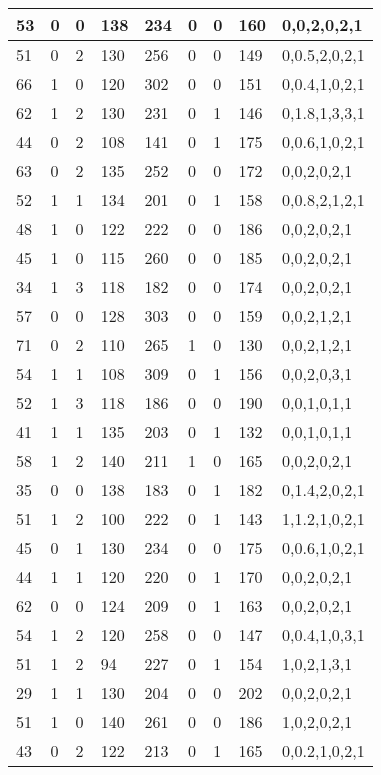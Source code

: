 \documentclass{article}
\begin{document}
\begin{table}[h!]
\begin{tabular}{|l|l|l|l|l|l|l|l|l|}
53 & 0 & 0 & 138 & 234 & 0 & 0 & 160 & 0,0,2,0,2,1 \\ \hline
51 & 0 & 2 & 130 & 256 & 0 & 0 & 149 & 0,0.5,2,0,2,1 \\ \hline
66 & 1 & 0 & 120 & 302 & 0 & 0 & 151 & 0,0.4,1,0,2,1 \\ \hline
62 & 1 & 2 & 130 & 231 & 0 & 1 & 146 & 0,1.8,1,3,3,1 \\ \hline
44 & 0 & 2 & 108 & 141 & 0 & 1 & 175 & 0,0.6,1,0,2,1 \\ \hline
63 & 0 & 2 & 135 & 252 & 0 & 0 & 172 & 0,0,2,0,2,1 \\ \hline
52 & 1 & 1 & 134 & 201 & 0 & 1 & 158 & 0,0.8,2,1,2,1 \\ \hline
48 & 1 & 0 & 122 & 222 & 0 & 0 & 186 & 0,0,2,0,2,1 \\ \hline
45 & 1 & 0 & 115 & 260 & 0 & 0 & 185 & 0,0,2,0,2,1 \\ \hline
34 & 1 & 3 & 118 & 182 & 0 & 0 & 174 & 0,0,2,0,2,1 \\ \hline
57 & 0 & 0 & 128 & 303 & 0 & 0 & 159 & 0,0,2,1,2,1 \\ \hline
71 & 0 & 2 & 110 & 265 & 1 & 0 & 130 & 0,0,2,1,2,1 \\ \hline
54 & 1 & 1 & 108 & 309 & 0 & 1 & 156 & 0,0,2,0,3,1 \\ \hline
52 & 1 & 3 & 118 & 186 & 0 & 0 & 190 & 0,0,1,0,1,1 \\ \hline
41 & 1 & 1 & 135 & 203 & 0 & 1 & 132 & 0,0,1,0,1,1 \\ \hline
58 & 1 & 2 & 140 & 211 & 1 & 0 & 165 & 0,0,2,0,2,1 \\ \hline
35 & 0 & 0 & 138 & 183 & 0 & 1 & 182 & 0,1.4,2,0,2,1 \\ \hline
51 & 1 & 2 & 100 & 222 & 0 & 1 & 143 & 1,1.2,1,0,2,1 \\ \hline
45 & 0 & 1 & 130 & 234 & 0 & 0 & 175 & 0,0.6,1,0,2,1 \\ \hline
44 & 1 & 1 & 120 & 220 & 0 & 1 & 170 & 0,0,2,0,2,1 \\ \hline
62 & 0 & 0 & 124 & 209 & 0 & 1 & 163 & 0,0,2,0,2,1 \\ \hline
54 & 1 & 2 & 120 & 258 & 0 & 0 & 147 & 0,0.4,1,0,3,1 \\ \hline
51 & 1 & 2 & 94 & 227 & 0 & 1 & 154 & 1,0,2,1,3,1 \\ \hline
29 & 1 & 1 & 130 & 204 & 0 & 0 & 202 & 0,0,2,0,2,1 \\ \hline
51 & 1 & 0 & 140 & 261 & 0 & 0 & 186 & 1,0,2,0,2,1 \\ \hline
43 & 0 & 2 & 122 & 213 & 0 & 1 & 165 & 0,0.2,1,0,2,1 \\ \hline

\end{tabular}
\end{table}
\end{document}
